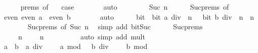 \begin{isabellebody}
\ \ \ \ \isamarkupfalse%
\ {\isachardoublequoteopen}{}{\isachardot}{\kern0pt}prems{\isachardoublequoteclose}{\isacharparenleft}{\kern0pt}{}{\isacharparenright}{\kern0pt}\ {\isacharbrackleft}{\kern0pt}of\ {}{\isacharbrackright}{\kern0pt}\ \isamarkupfalse%
\ {\isacharquery}{\kern0pt}case\isanewline
\ \ \ \ \ \ \isamarkupfalse%
\ auto\isanewline
\ \ \isamarkupfalse%
\isanewline
\ \ \ \ \isamarkupfalse%
\ {\isacharparenleft}{\kern0pt}Suc\ n{\isacharparenright}{\kern0pt}\isanewline
\ \ \ \ \isamarkupfalse%
\ Suc{\isachardot}{\kern0pt}prems{\isacharparenleft}{\kern0pt}{}{\isacharparenright}{\kern0pt}\ {\isacharbrackleft}{\kern0pt}of\ {}{\isacharbrackright}{\kern0pt}\ \isamarkupfalse%
\ even{\isacharcolon}{\kern0pt}\ {\isacartoucheopen}even\ a\ {\isasymor}\ even\ b{\isacartoucheclose}\isanewline
\ \ \ \ \ \ \isamarkupfalse%
\ auto\isanewline
\ \ \ \ \isamarkupfalse%
\ bit{\isacharcolon}{\kern0pt}\ {\isacartoucheopen}{\isasymnot}\ bit\ {\isacharparenleft}{\kern0pt}a\ div\ {}{\isacharparenright}{\kern0pt}\ n\ {\isasymor}\ {\isasymnot}\ bit\ {\isacharparenleft}{\kern0pt}b\ div\ {}{\isacharparenright}{\kern0pt}\ n{\isacartoucheclose}\ \ n\isanewline
\ \ \ \ \ \ \isamarkupfalse%
\ Suc{\isachardot}{\kern0pt}prems{\isacharparenleft}{\kern0pt}{}{\isacharparenright}{\kern0pt}\ {\isacharbrackleft}{\kern0pt}of\ {\isacartoucheopen}Suc\ n{\isacartoucheclose}{\isacharbrackright}{\kern0pt}\ \isamarkupfalse%
\ {\isacharparenleft}{\kern0pt}simp\ add{\isacharcolon}{\kern0pt}\ bit{\isacharunderscore}{\kern0pt}Suc{\isacharparenright}{\kern0pt}\isanewline
\ \ \ \ \isamarkupfalse%
\ Suc{\isachardot}{\kern0pt}prems{\isacharparenleft}{\kern0pt}{}{\isacharparenright}{\kern0pt}\ \isamarkupfalse%
\ {\isacartoucheopen}{}\ {\isacharasterisk}{\kern0pt}\ {}\ {\isacharcircum}{\kern0pt}\ n\ {\isasymnoteq}\ {}{\isacartoucheclose}\ {\isacartoucheopen}{}\ {\isacharcircum}{\kern0pt}\ n\ {\isasymnoteq}\ {}{\isacartoucheclose}\isanewline
\ \ \ \ \ \ \isamarkupfalse%
\ {\isacharparenleft}{\kern0pt}auto\ simp\ add{\isacharcolon}{\kern0pt}\ mult{\isacharunderscore}{\kern0pt}{}{\isacharparenright}{\kern0pt}\isanewline
\ \ \ \ \isamarkupfalse%
\ {\isacartoucheopen}a\ {\isacharplus}{\kern0pt}\ b\ {\isacharequal}{\kern0pt}\ {\isacharparenleft}{\kern0pt}a\ div\ {}\ {\isacharasterisk}{\kern0pt}\ {}\ {\isacharplus}{\kern0pt}\ a\ mod\ {}{\isacharparenright}{\kern0pt}\ {\isacharplus}{\kern0pt}\ {\isacharparenleft}{\kern0pt}b\ div\ {}\ {\isacharasterisk}{\kern0pt}\ {}\ {\isacharplus}{\kern0pt}\ b\ mod\ {}{\isacharparenright}{\kern0pt}{\isacartoucheclose}\isanewline

\end{isabellebody}
